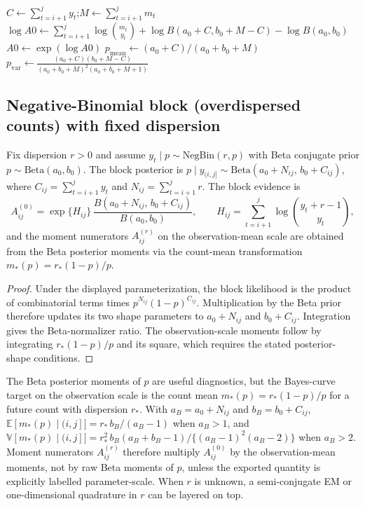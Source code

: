 \begin{algorithm}[H]
\caption{BinomialBlock$(y,m,i,j,a_0,b_0)$}
\label{alg:binomial-block}
\KwIn{Block $(i,j]$; successes $y_{i+1:j}$; trials $m_{i+1:j}$}
$C\leftarrow \sum_{t=i+1}^j y_t$;\quad $M\leftarrow \sum_{t=i+1}^j m_t$\;
$\log A0 \leftarrow \sum_{t=i+1}^j \log \binom{m_t}{y_t}
+ \log B(a_0+C,b_0+M-C)
- \log B(a_0,b_0)$\;
$A0\leftarrow \exp(\log A0)$\;
$p_{\text{mean}}\leftarrow (a_0+C)/(a_0+b_0+M)$\;
$p_{\text{var}}\leftarrow \frac{(a_0+C)(b_0+M-C)}
{(a_0+b_0+M)^2(a_0+b_0+M+1)}$\;
\end{algorithm}

\subsection{Negative-Binomial block (overdispersed counts) with fixed dispersion}
\label{sec:nb-block}

\begin{proposition}
\label{prop:negbin-block}
Fix dispersion $r>0$ and assume $y_t\mid p\sim\mathrm{NegBin}(r,p)$ with Beta conjugate prior
$p\sim\mathrm{Beta}(a_0,b_0)$. The block posterior is
$p\mid y_{(i,j]}\sim\mathrm{Beta}(a_0+N_{ij},\,b_0+C_{ij})$, where
$C_{ij}=\sum_{t=i+1}^j y_t$ and $N_{ij}=\sum_{t=i+1}^j r$. The block evidence is
\[
A^{(0)}_{ij}=\exp\{H_{ij}\}\,\frac{B(a_0+N_{ij},\,b_0+C_{ij})}{B(a_0,b_0)},
\qquad H_{ij}=\sum_{t=i+1}^j\log\binom{y_t+r-1}{y_t},
\]
and the moment numerators $A^{(r)}_{ij}$ on the observation-mean scale are obtained from the
Beta posterior moments via the count-mean transformation $m_*(p)=r_*(1-p)/p$.
\end{proposition}
\begin{proof}
Under the displayed parameterization, the block likelihood is the product of combinatorial terms
times $p^{N_{ij}}(1-p)^{C_{ij}}$. Multiplication by the Beta prior therefore updates its two shape
parameters to $a_0+N_{ij}$ and $b_0+C_{ij}$. Integration gives the Beta-normalizer ratio. The
observation-scale moments follow by integrating $r_*(1-p)/p$ and its square, which requires the
stated posterior-shape conditions.
\end{proof}

\begin{remark}
\label{rem:negbin-obs-scale}
The Beta posterior moments of $p$ are useful diagnostics, but the Bayes-curve target on the
observation scale is the count mean $m_*(p)=r_*(1-p)/p$ for a future count with dispersion $r_*$.
With $a_B=a_0+N_{ij}$ and $b_B=b_0+C_{ij}$,
\(\mathbb{E}[m_*(p)\mid(i,j]] = r_*\,b_B/(a_B-1)\) when $a_B>1$, and
\(\mathbb{V}[m_*(p)\mid(i,j]] = r_*^2\,b_B(a_B+b_B-1)/\{(a_B-1)^2(a_B-2)\}\) when $a_B>2$.
Moment numerators $A^{(r)}_{ij}$ therefore multiply $A^{(0)}_{ij}$ by the observation-mean
moments, not by raw Beta moments of $p$, unless the exported quantity is explicitly labelled
parameter-scale. When $r$ is unknown, a semi-conjugate EM or one-dimensional quadrature in $r$
can be layered on top.
\end{remark}

